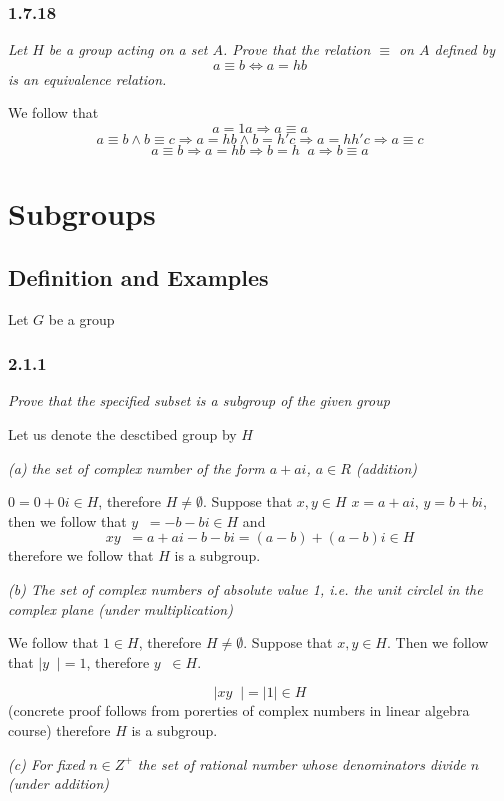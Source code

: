 \documentclass[11pt,oneside,titlepage]{book}
\DeclareMathOperator \inv {^{-1}}
\DeclareMathOperator \ra {\Rightarrow}
\begin{document}
\subsection{1.7.18}

\textit{Let $H$ be a group acting on a set $A$. Prove that the relation $\equiv$ on $A$
  defined by
  $$a \equiv b \iff a = hb$$
  is an equivalence relation. }

We follow that
$$a = 1a \ra a \equiv a$$
$$a \equiv b \land b \equiv c \ra a = hb \land b = h'c \ra a = hh' c \ra a \equiv c$$
$$a \equiv b \ra a = hb \ra b = h\inv a \ra b \equiv a$$

\chapter{Subgroups}

\section{Definition and Examples}

Let $G$ be a group

\subsection{2.1.1}

\textit{Prove that the specified subset is a subgroup of the given group}

Let us denote the desctibed group by $H$

\textit{(a) the set of complex number of the form $a + ai$, $a \in R$ (addition)}

$0 = 0 + 0i \in H$, therefore $H \neq \emptyset$.
Suppose that $x, y \in H$ $x = a + ai$, $y = b + bi$,
then we follow that $y\inv = -b -bi \in H$ and
$$xy\inv = a + ai - b - bi = (a - b) + (a - b)i \in H$$
therefore we follow that $H$ is a subgroup.

\textit{(b) The set of complex numbers of absolute value 1, i.e. the unit circlel in
  the complex plane (under multiplication)}

We follow that $1 \in H$, therefore $H \neq \emptyset$. Suppose that $x, y \in H$.
Then we follow that $|y\inv| = 1$, therefore $y\inv \in H$.

$$|xy\inv | = |1| \in H$$
(concrete proof follows from porerties of complex numbers in linear algebra course)
therefore $H$ is a subgroup.

\textit{(c) For fixed $n \in Z^+$ the set of rational number whose denominators divide $n$
  (under addition)}
\end{document}
